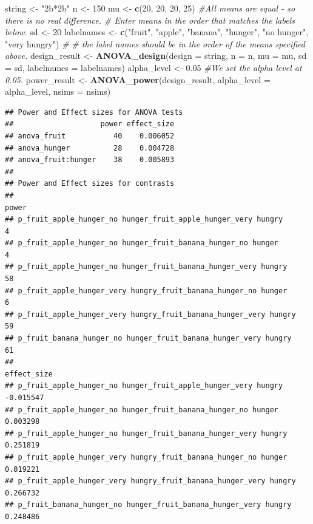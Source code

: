 \documentclass[]{book}
\newenvironment{Shaded}{\begin{snugshade}}{\end{snugshade}}
\newcommand{\CommentTok}[1]{\textcolor[rgb]{0.56,0.35,0.01}{\textit{#1}}}
\newcommand{\DataTypeTok}[1]{\textcolor[rgb]{0.13,0.29,0.53}{#1}}
\newcommand{\DecValTok}[1]{\textcolor[rgb]{0.00,0.00,0.81}{#1}}
\newcommand{\FloatTok}[1]{\textcolor[rgb]{0.00,0.00,0.81}{#1}}
\newcommand{\KeywordTok}[1]{\textcolor[rgb]{0.13,0.29,0.53}{\textbf{#1}}}
\newcommand{\NormalTok}[1]{#1}
\newcommand{\StringTok}[1]{\textcolor[rgb]{0.31,0.60,0.02}{#1}}
\begin{document}
\begin{Shaded}
\begin{Highlighting}[]
\NormalTok{string <-}\StringTok{ "2b*2b"}
\NormalTok{n <-}\StringTok{ }\DecValTok{150}
\NormalTok{mu <-}\StringTok{ }\KeywordTok{c}\NormalTok{(}\DecValTok{20}\NormalTok{, }\DecValTok{20}\NormalTok{, }\DecValTok{20}\NormalTok{, }\DecValTok{25}\NormalTok{) }\CommentTok{#All means are equal - so there is no real difference.}
\CommentTok{# Enter means in the order that matches the labels below.}
\NormalTok{sd <-}\StringTok{ }\DecValTok{20}
\NormalTok{labelnames <-}\StringTok{ }\KeywordTok{c}\NormalTok{(}\StringTok{"fruit"}\NormalTok{, }\StringTok{"apple"}\NormalTok{, }\StringTok{"banana"}\NormalTok{, }\StringTok{"hunger"}\NormalTok{, }\StringTok{"no hunger"}\NormalTok{, }\StringTok{"very hungry"}\NormalTok{) }\CommentTok{#}
\CommentTok{# the label names should be in the order of the means specified above.}
\NormalTok{design_result <-}\StringTok{ }\KeywordTok{ANOVA_design}\NormalTok{(}\DataTypeTok{design =}\NormalTok{ string,}
                   \DataTypeTok{n =}\NormalTok{ n, }
                   \DataTypeTok{mu =}\NormalTok{ mu, }
                   \DataTypeTok{sd =}\NormalTok{ sd, }
                   \DataTypeTok{labelnames =}\NormalTok{ labelnames)}
\NormalTok{alpha_level <-}\StringTok{ }\FloatTok{0.05} \CommentTok{#We set the alpha level at 0.05. }
\NormalTok{power_result <-}\StringTok{ }\KeywordTok{ANOVA_power}\NormalTok{(design_result, }\DataTypeTok{alpha_level =}\NormalTok{ alpha_level, }\DataTypeTok{nsims =}\NormalTok{ nsims)}
\end{Highlighting}
\end{Shaded}

\begin{verbatim}
## Power and Effect sizes for ANOVA tests
##                    power effect_size
## anova_fruit           40    0.006052
## anova_hunger          28    0.004728
## anova_fruit:hunger    38    0.005893
## 
## Power and Effect sizes for contrasts
##                                                                  power
## p_fruit_apple_hunger_no hunger_fruit_apple_hunger_very hungry        4
## p_fruit_apple_hunger_no hunger_fruit_banana_hunger_no hunger         4
## p_fruit_apple_hunger_no hunger_fruit_banana_hunger_very hungry      58
## p_fruit_apple_hunger_very hungry_fruit_banana_hunger_no hunger       6
## p_fruit_apple_hunger_very hungry_fruit_banana_hunger_very hungry    59
## p_fruit_banana_hunger_no hunger_fruit_banana_hunger_very hungry     61
##                                                                  effect_size
## p_fruit_apple_hunger_no hunger_fruit_apple_hunger_very hungry      -0.015547
## p_fruit_apple_hunger_no hunger_fruit_banana_hunger_no hunger        0.003298
## p_fruit_apple_hunger_no hunger_fruit_banana_hunger_very hungry      0.251819
## p_fruit_apple_hunger_very hungry_fruit_banana_hunger_no hunger      0.019221
## p_fruit_apple_hunger_very hungry_fruit_banana_hunger_very hungry    0.266732
## p_fruit_banana_hunger_no hunger_fruit_banana_hunger_very hungry     0.248486
\end{verbatim}
\end{document}
